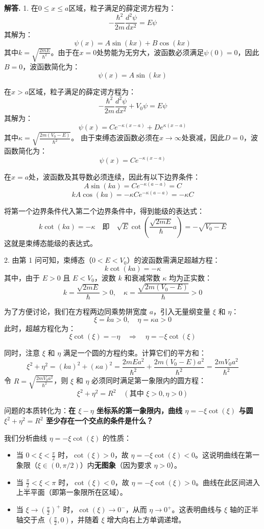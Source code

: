 \documentclass[12pt, a4paper, oneside]{ctexart}
\newenvironment{solution}{\par\noindent\textbf{解答. }}{\par}
\begin{document}
\begin{solution}
1.
    在$0 \le x \le a$区域，粒子满足的薛定谔方程为：
    \[ -\frac{\hbar^2}{2m} \frac{d^2 \psi}{dx^2} = E \psi \]
    其解为：
    \[ \psi(x) = A \sin(kx) + B \cos(kx) \]
    其中$k = \sqrt{\frac{2mE}{\hbar^2}}$。由于在$x=0$处势能为无穷大，波函数必须满足$\psi(0) = 0$，因此$B=0$，波函数简化为：
    \[ \psi(x) = A \sin(kx) \]
    
    在$x > a$区域，粒子满足的薛定谔方程为：
    \[ -\frac{\hbar^2}{2m} \frac{d^2 \psi}{dx^2} + V_0 \psi = E \psi \]
    其解为：
    \[ \psi(x) = C e^{-\kappa (x-a)} + D e^{\kappa (x-a)}\]
    其中$\kappa = \sqrt{\frac{2m(V_0 - E)}{\hbar^2}}$。
    由于束缚态波函数必须在$x\to \infty$处衰减，因此$D=0$，波函数简化为：
    \[ \psi(x) = C e^{-\kappa (x-a)} \]

    在$x=a$处，波函数及其导数必须连续，因此有以下边界条件：
    \[ A \sin(ka) = C e^{-\kappa (a-a)} = C \]
    \[ k A \cos(ka) = -\kappa C e^{-\kappa (a-a)} = -\kappa C \]
    
    将第一个边界条件代入第二个边界条件中，得到能级的表达式：
    \[ k \cot(ka) = -\kappa \quad \text{即} \quad \sqrt{E}\cot(\frac{\sqrt{2mE}}{\hbar}a) = -\sqrt{V_0 - E} \]
    这就是束缚态能级的表达式。

2.
由第 1 问可知，束缚态（$0 < E < V_0$）的波函数需满足超越方程：
\[
    k \cot(ka) = -\kappa
\]
其中，由于 $E > 0$ 且 $E < V_0$，波数 $k$ 和衰减常数 $\kappa$ 均为正实数：
\[
    k = \frac{\sqrt{2mE}}{\hbar} > 0, \quad \kappa = \frac{\sqrt{2m(V_0 - E)}}{\hbar} > 0
\]

为了方便讨论，我们在方程两边同乘势阱宽度 $a$，引入无量纲变量 $\xi$ 和 $\eta$：
\[
    \xi = ka > 0, \quad \eta = \kappa a > 0
\]
此时，超越方程化为：
\[
    \xi \cot(\xi) = -\eta \quad \Rightarrow \quad \eta = -\xi \cot(\xi)
\]

同时，注意 $\xi$ 和 $\eta$ 满足一个圆的方程约束。计算它们的平方和：
\[
    \xi^2 + \eta^2 = (ka)^2 + (\kappa a)^2 = \frac{2mEa^2}{\hbar^2} + \frac{2m(V_0 - E)a^2}{\hbar^2} = \frac{2mV_0a^2}{\hbar^2}
\]
令 $R = \sqrt{\frac{2mV_0a^2}{\hbar^2}}$，则 $\xi$ 和 $\eta$ 必须同时满足第一象限内的圆方程：
\[
    \xi^2 + \eta^2 = R^2 \quad (\text{其中 } \xi > 0, \eta > 0)
\]

问题的本质转化为：\textbf{在 $\xi-\eta$ 坐标系的第一象限内，曲线 $\eta = -\xi \cot(\xi)$ 与圆 $\xi^2 + \eta^2 = R^2$ 至少存在一个交点的条件是什么？}

我们分析曲线 $\eta = -\xi \cot(\xi)$ 的性质：
\begin{itemize}
    \item 当 $0 < \xi < \frac{\pi}{2}$ 时，$\cot(\xi) > 0$，故 $\eta = -\xi \cot(\xi) < 0$。这说明曲线在第一象限（$\xi \in (0, \pi/2)$）内\textbf{无图象}（因为要求 $\eta > 0$）。
    \item 当 $\frac{\pi}{2} < \xi < \pi$ 时，$\cot(\xi) < 0$，故 $\eta = -\xi \cot(\xi) > 0$。曲线在此区间进入上半平面（即第一象限所在区域）。
    \item 当 $\xi \to \left(\frac{\pi}{2}\right)^+$ 时，$\cot(\xi) \to 0^-$，从而 $\eta \to 0^+$。这表明曲线与 $\xi$ 轴的正半轴交于点 $\left(\frac{\pi}{2}, 0\right)$，并随着 $\xi$ 增大向右上方单调递增。
\end{itemize}


\end{solution}
\end{document}
